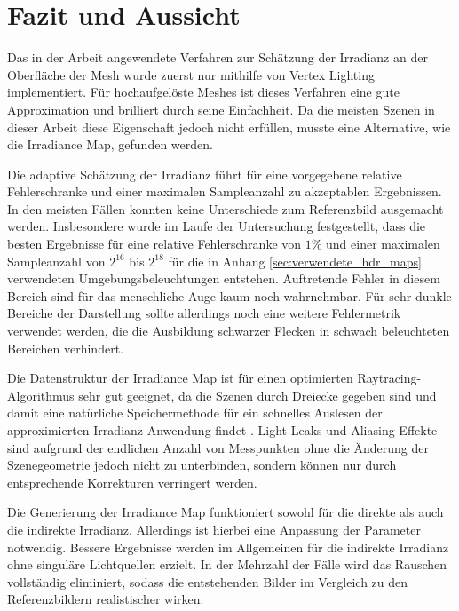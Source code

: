 \section{Fazit und Aussicht} %
\label{sec:fazit_und_aussicht}

	Das in der Arbeit angewendete Verfahren zur Schätzung der Irradianz an der Oberfläche der Mesh wurde zuerst nur mithilfe von Vertex Lighting implementiert.
	Für hochaufgelöste Meshes ist dieses Verfahren eine gute Approximation und brilliert durch seine Einfachheit.
	Da die meisten Szenen in dieser Arbeit diese Eigenschaft jedoch nicht erfüllen, musste eine Alternative, wie die Irradiance Map, gefunden werden.

	Die adaptive Schätzung der Irradianz führt für eine vorgegebene relative Fehlerschranke und einer maximalen Sampleanzahl zu akzeptablen Ergebnissen.
	In den meisten Fällen konnten keine Unterschiede zum Referenzbild ausgemacht werden.
	Insbesondere wurde im Laufe der Untersuchung festgestellt, dass die besten Ergebnisse für eine relative Fehlerschranke von $1\unit{\%}$ und einer maximalen Sampleanzahl von $2^{16}$ bis $2^{18}$ für die in Anhang \ref{sec:verwendete_hdr_maps} verwendeten Umgebungsbeleuchtungen entstehen.
	Auftretende Fehler in diesem Bereich sind für das menschliche Auge kaum noch wahrnehmbar.
	Für sehr dunkle Bereiche der Darstellung sollte allerdings noch eine weitere Fehlermetrik verwendet werden, die die Ausbildung schwarzer Flecken in schwach beleuchteten Bereichen verhindert.

	Die Datenstruktur der Irradiance Map ist für einen optimierten Raytracing-Algorithmus sehr gut geeignet, da die Szenen durch Dreiecke gegeben sind und damit eine natürliche Speichermethode für ein schnelles Auslesen der approximierten Irradianz Anwendung findet \cite{ray-triangle-intersection}.
	Light Leaks und Aliasing-Effekte sind aufgrund der endlichen Anzahl von Messpunkten ohne die Änderung der Szenegeometrie jedoch nicht zu unterbinden, sondern können nur durch entsprechende Korrekturen verringert werden.

	Die Generierung der Irradiance Map funktioniert sowohl für die direkte als auch die indirekte Irradianz.
	Allerdings ist hierbei eine Anpassung der Parameter notwendig.
	Bessere Ergebnisse werden im Allgemeinen für die indirekte Irradianz ohne singuläre Lichtquellen erzielt.
	In der Mehrzahl der Fälle wird das Rauschen vollständig eliminiert, sodass die entstehenden Bilder im Vergleich zu den Referenzbildern realistischer wirken.

